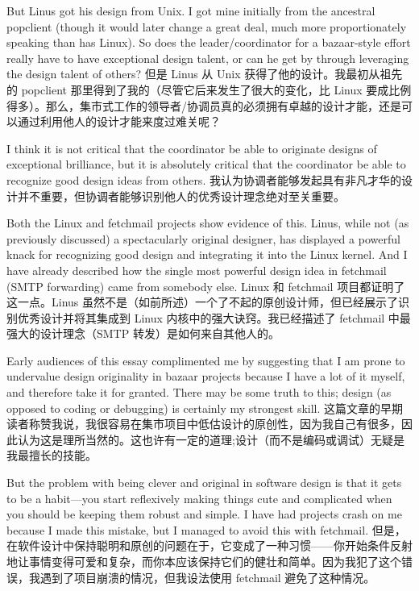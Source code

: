 \documentclass[a4paper,12pt,UTF8,twoside]{ctexbook}
\begin{document}
But Linus got his design from Unix. I got mine initially from the ancestral popclient (though it would later change a great deal, much more proportionately speaking than has Linux). So does the leader/coordinator for a bazaar-style effort really have to have exceptional design talent, or can he get by through leveraging the design talent of others?
但是 Linus 从 Unix 获得了他的设计。我最初从祖先的 popclient 那里得到了我的（尽管它后来发生了很大的变化，比 Linux 要成比例得多）。那么，集市式工作的领导者/协调员真的必须拥有卓越的设计才能，还是可以通过利用他人的设计才能来度过难关呢？

I think it is not critical that the coordinator be able to originate designs of exceptional brilliance, but it is absolutely critical that the coordinator be able to recognize good design ideas from others.
我认为协调者能够发起具有非凡才华的设计并不重要，但协调者能够识别他人的优秀设计理念绝对至关重要。

Both the Linux and fetchmail projects show evidence of this. Linus, while not (as previously discussed) a spectacularly original designer, has displayed a powerful knack for recognizing good design and integrating it into the Linux kernel. And I have already described how the single most powerful design idea in fetchmail (SMTP forwarding) came from somebody else.
Linux 和 fetchmail 项目都证明了这一点。Linus 虽然不是（如前所述）一个了不起的原创设计师，但已经展示了识别优秀设计并将其集成到 Linux 内核中的强大诀窍。我已经描述了 fetchmail 中最强大的设计理念（SMTP 转发）是如何来自其他人的。

Early audiences of this essay complimented me by suggesting that I am prone to undervalue design originality in bazaar projects because I have a lot of it myself, and therefore take it for granted. There may be some truth to this; design (as opposed to coding or debugging) is certainly my strongest skill.
这篇文章的早期读者称赞我说，我很容易在集市项目中低估设计的原创性，因为我自己有很多，因此认为这是理所当然的。这也许有一定的道理;设计（而不是编码或调试）无疑是我最擅长的技能。

But the problem with being clever and original in software design is that it gets to be a habit—you start reflexively making things cute and complicated when you should be keeping them robust and simple. I have had projects crash on me because I made this mistake, but I managed to avoid this with fetchmail.
但是，在软件设计中保持聪明和原创的问题在于，它变成了一种习惯——你开始条件反射地让事情变得可爱和复杂，而你本应该保持它们的健壮和简单。因为我犯了这个错误，我遇到了项目崩溃的情况，但我设法使用 fetchmail 避免了这种情况。
\end{document}

